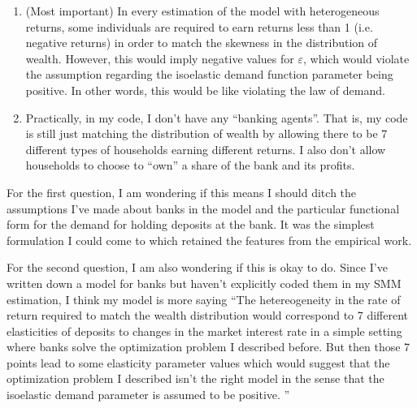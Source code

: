 \documentclass{article}
\newcommand{\say}[1]{``#1''}
\begin{document}
\begin{enumerate}
\item (Most important) In every estimation of the model with heterogeneous returns, some individuals are required to earn returns less than 1 (i.e. negative returns) in order to match the skewness in the distribution of wealth. However, this would imply negative values for $\varepsilon$, which would violate the assumption regarding the isoelastic demand function parameter being positive. In other words, this would be like violating the law of demand.
  \item Practically, in my code, I don't have any \say{banking agents}. That is, my code is still just matching the distribution of wealth by allowing there to be 7 different types of households earning different returns. I also don't allow households to choose to \say{own} a share of the bank and its profits.
  \end{enumerate}

  \par For the first question, I am wondering if this means I should ditch the assumptions I've made about banks in the model and the particular functional form for the demand for holding deposits at the bank. It was the simplest formulation I could come to which retained the features from the empirical work.

  \par For the second question, I am also wondering if this is okay to do. Since I've written down a model for banks but haven't explicitly coded them in my SMM estimation, I think my model is more saying \say{The hetereogeneity in the rate of return required to match the wealth distribution would correspond to 7 different elasticities of deposits to changes in the market interest rate in a simple setting where banks solve the optimization problem I described before. But then those 7 points lead to some elasticity parameter values which would suggest that the optimization problem I described isn't the right model in the sense that the isoelastic demand parameter is assumed to be positive. }

  \printbibliography
\end{document}
